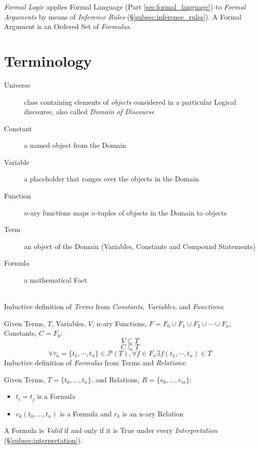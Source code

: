 \documentclass{article}
\begin{document}
\emph{Formal Logic} applies Formal Language (Part
\ref{sec:formal_language}) to \emph{Formal Arguments} by means of
\emph{Inference Rules} (\S\ref{subsec:inference_rules}). A Formal
Argument is an Ordered Set of \emph{Formulas}.



\section{Terminology}\label{sec:logic_terminology}

\begin{description}
\item[Universe] class containing elements of \emph{objects} considered
  in a particular Logical discourse, also called \emph{Domain of
    Discourse}
\item[Constant] a named object from the Domain
\item[Variable] a placeholder that ranges over the objects in the
  Domain
\item[Function] $n$-ary functions maps $n$-tuples of objects in the
  Domain to objects
\item[Term] an object of the Domain (Variables, Constants and Compound
  Statements)
\item[Formula] a mathematical Fact
\end{description}
\hfill \\ Inductive definition of \emph{Terms} from \emph{Constants},
\emph{Variables}, and \emph{Functions}:

Given Terms, $T$, Variables, $V$, n-ary Functions, $F = F_0 \cup F_1
\cup F_2 \cup \cdots \cup F_n$, Constants, $C = F_0$:
\[
    V \subseteq T
\]\[
    C \subseteq T
\]\[
    \forall \tau_n=\{t_1,\cdots,t_n\} \in \mathcal{P}(T), \forall f \in F_n
    \exists f(t_1,\cdots,t_n) \in T
\]
Inductive definition of \emph{Formulas} from Terms and
\emph{Relations}:

Given Terms, $T = \{t_0,\ldots,t_n\}$, and Relations, $R = \{r_0,\ldots,r_m\}$:
\begin{itemize}
\item $t_i = t_j$ is a Formula
\item $r_k(t_0,\ldots,t_n)$ is a Formula and $r_k$ is an n-ary Relation
\end{itemize}
A Formula is \emph{Valid} if and only if it is True under every
\emph{Interpretation} (\S\ref{subsec:interpretation}).
\end{document}
